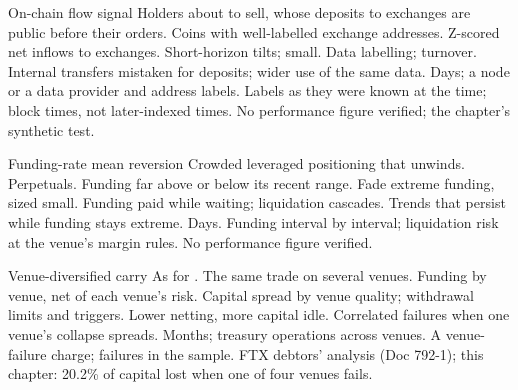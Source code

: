 \begin{strategyfile}{On-chain flow signal}\label{strat:s1:crypto-medium-frequency-strategies:onchain}
 Holders about to sell, whose deposits to exchanges are public before their orders.
 Coins with well-labelled exchange addresses.
 Z-scored net inflows to exchanges.
 Short-horizon tilts; small.
 Data labelling; turnover.
 Internal transfers mistaken for deposits; wider use of the same data.
 Days; a node or a data provider and address labels.
 Labels as they were known at the time; block times, not later-indexed times.
 No performance figure verified; the chapter's synthetic test.
\end{strategyfile}

\begin{strategyfile}{Funding-rate mean reversion}\label{strat:s1:crypto-medium-frequency-strategies:meanrev}
 Crowded leveraged positioning that unwinds.
 Perpetuals.
 Funding far above or below its recent range.
 Fade extreme funding, sized small.
 Funding paid while waiting; liquidation cascades.
 Trends that persist while funding stays extreme.
 Days.
 Funding interval by interval; liquidation risk at the venue's margin rules.
 No performance figure verified.
\end{strategyfile}

\begin{strategyfile}{Venue-diversified carry}\label{strat:s1:crypto-medium-frequency-strategies:venue}
 As for .
 The same trade on several venues.
 Funding by venue, net of each venue's risk.
 Capital spread by venue quality; withdrawal limits and triggers.
 Lower netting, more capital idle.
 Correlated failures when one venue's collapse spreads.
 Months; treasury operations across venues.
 A venue-failure charge; failures in the sample.
 FTX debtors' analysis (Doc 792-1); this chapter: 20.2\% of capital lost when one of four venues fails.
\end{strategyfile}

